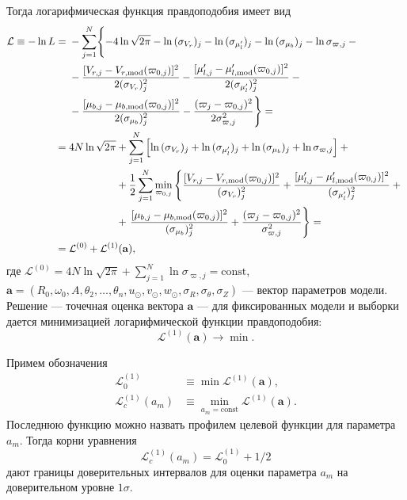 \documentclass[a4paper, oneside, 14pt]{article}
\begin{document}
Тогда логарифмическая функция правдоподобия имеет вид
%
{\allowdisplaybreaks
\begin{align}
  \label{eq:L}\nonumber
  \mathcal{L} \equiv -\ln{L} &=
  \begin{aligned}[t]
    &-\sum_{j=1}^N \Biggl\{ -4 \ln{\sqrt{2 \pi}} - \ln{(\sigma_{V_r})_j} - \ln{(\sigma_{\mu_l'})_j} - \ln{(\sigma_{\mu_b})_j} - \ln{\sigma_{\varpi,j}} - {}\\
    &-\frac{[ V_{r,j} - V_{r,\text{mod}}(\varpi_{0,j}) ]^2}{2 (\sigma_{V_r})_j^2} - \frac{[ \mu_{l,j}' - \mu_{l,\text{mod}}'(\varpi_{0,j}) ]^2}{2 (\sigma_{\mu_l'})_j^2} - {}\\
    &-\frac{[ \mu_{b,j} - \mu_{b,\text{mod}}(\varpi_{0,j}) ]^2}{2 (\sigma_{\mu_b})_j^2} - \frac{( \varpi_j - \varpi_{0,j} )^2}{2 \sigma_{\varpi,j}^2} \Biggr\} = {}
  \end{aligned}\\
  \nonumber
  &= 4 N \ln{\sqrt{2 \pi}}
  \begin{aligned}[t]
    &+ \sum_{j=1}^N \left[ \ln{(\sigma_{V_r})_j} + \ln{(\sigma_{\mu_l'})_j} + \ln{(\sigma_{\mu_b})_j} + \ln{\sigma_{\varpi,j}} \right] + {}\\
    &+ \frac{1}{2} \sum_{j=1}^N \min_{\varpi_{0,j}} \left\{ \frac{[ V_{r,j} - V_{r,\text{mod}}(\varpi_{0,j}) ]^2}{(\sigma_{V_r})_j^2} + \frac{[ \mu_{l,j}' - \mu_{l,\text{mod}}'(\varpi_{0,j}) ]^2}{(\sigma_{\mu_l'})_j^2} + {} \right.\\
    &+ \left. \frac{[ \mu_{b,j} - \mu_{b,\text{mod}}(\varpi_{0,j}) ]^2}{(\sigma_{\mu_b})_j^2} + \frac{( \varpi_j - \varpi_{0,j} )^2}{\sigma_{\varpi,j}^2} \vphantom{\frac{[ \mu_{l,j}' - \mu_{l,\text{mod}}'(\varpi_{0,j}) ]^2}{(\sigma_{\mu_l'})_j^2}} \right\} = {}
  \end{aligned}\\
  &= \mathcal{L}^{(0)} + \mathcal{L}^{(1)}(\mathbf{a}),
\end{align}
}%
%
где $ \mathcal{L}^{(0)} = 4 N \ln{\sqrt{2 \pi}} + \sum_{j=1}^N \ln{\sigma_{\varpi,j}} = \text{const} $, $ \mathbf{a} = (R_0, \omega_0, A, \theta_2, \ldots, \theta_n, u_\odot, v_\odot, w_\odot, \sigma_R, \sigma_\theta, \sigma_Z) $ --- вектор параметров модели. Решение --- точечная оценка вектора $ \mathbf{a} $ --- для фиксированных модели и выборки дается минимизацией логарифмической функции правдоподобия:
%
\begin{equation}
  \label{eq:L_1}
  \mathcal{L}^{(1)}(\mathbf{a}) \rightarrow \min.
\end{equation}

Примем обозначения
%
\begin{align}
  \mathcal{L}_0^{(1)} &\equiv \min{\mathcal{L}^{(1)}(\mathbf{a})},\\
  \label{eq:L_c}
  \mathcal{L}_c^{(1)}(a_m) &\equiv \min_{a_m = \text{const}}{\mathcal{L}^{(1)}(\mathbf{a})}.
\end{align}
%
Последнюю функцию можно назвать профилем целевой функции для параметра $ a_m $. Тогда корни уравнения
%
\begin{equation}
  \label{eq:L_c_roots}
  \mathcal{L}_c^{(1)}(a_m) = \mathcal{L}_0^{(1)} + 1 / 2
\end{equation}
%
дают границы доверительных интервалов для оценки параметра $ a_m $ на доверительном уровне $ 1 \sigma $.
\end{document}
